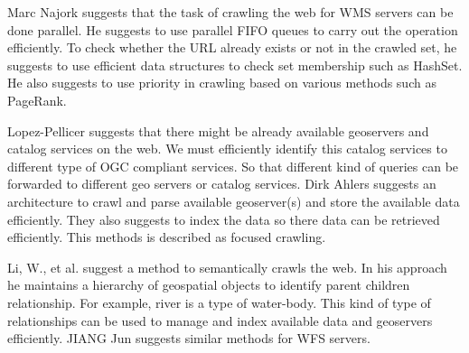 Marc Najork\cite{l3} suggests that the task of crawling the web for WMS servers can be done parallel. He suggests to use parallel FIFO queues to carry out the operation efficiently. To check whether the URL already exists or not in the crawled set, he suggests to use efficient data structures to check set membership such as HashSet. He also suggests to use priority in crawling based on various methods such as PageRank.\\
\par
Lopez-Pellicer\cite{l9} suggests that there might be already available geoservers and catalog services on the web. We must efficiently identify this catalog services to different type of OGC compliant services. So that different kind of queries can be forwarded to different geo servers or catalog services. Dirk Ahlers\cite{l4} suggests an architecture to crawl and parse available geoserver(s) and store the available data efficiently. They also suggests to index the data so there data can be retrieved efficiently. This methods is described as focused crawling.\\
\par
Li, W., et al.\cite{l5} suggest a method to semantically crawls the web. In his approach he maintains a hierarchy of geospatial objects to identify parent children relationship. For example, river is a type of water-body. This kind of type of relationships can be used to manage and index available data and geoservers efficiently. JIANG Jun\cite{l6} suggests similar methods for WFS servers.


